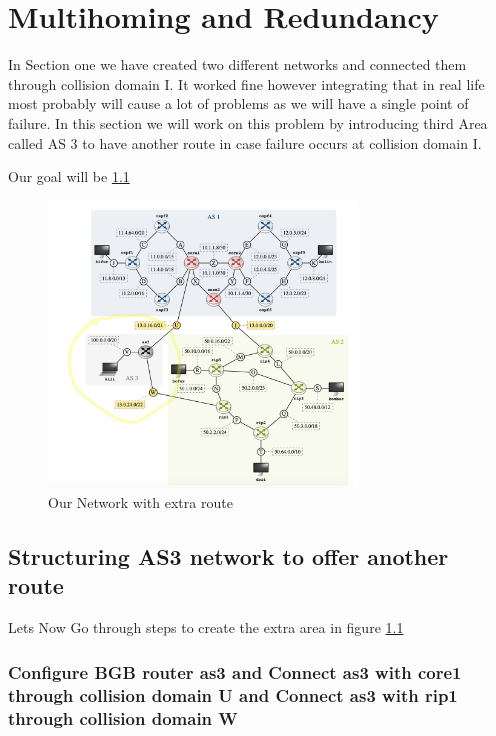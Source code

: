 \chapter{Multihoming and Redundancy}

\label{Multihoming and Redundancy}
In Section one we have created two different networks and connected them through collision domain I. It worked fine however integrating that in real life most probably will cause a lot of problems as we will have a single point of failure. In this section we will work on this problem by introducing third Area called AS 3 to have another route in case failure occurs at collision domain I.

Our goal will be \ref{fig:2.1}
\begin{figure}[H]
\centering
  \includegraphics[width=0.73\textwidth]{Images/NetERoute.png}
  \caption{Our Network with extra route}
  \label{fig:2.1}
\end{figure}

\section{Structuring AS3 network to offer another route}

Lets Now Go through steps to create the extra area in  figure \ref{fig:2.1}
\subsection{Configure BGB router \textbf{as3} and Connect as3 with core1 through collision domain U and Connect as3 with rip1 through collision domain W}

